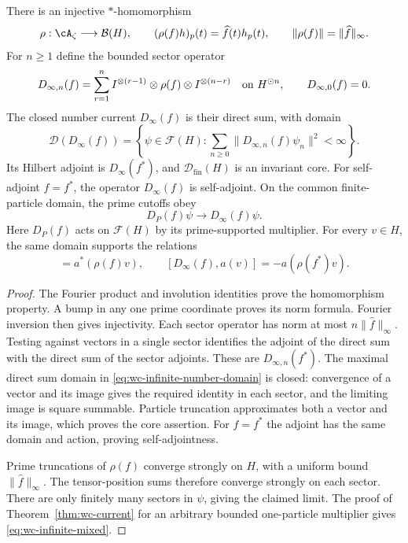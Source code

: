 \begin{proposition}
\label{prop:wc-infinite-multiplication}
There is an injective $*$-homomorphism
\[
 \rho:\cA_\zeta\longrightarrow\mathcal B(H),\qquad
 (\rho(f)h)_p(t)=\widehat f(t)h_p(t),\qquad
 \|\rho(f)\|=\|\widehat f\|_\infty.
\]
For $n\geq1$ define the bounded sector operator
\[
 D_{\infty,n}(f)=\sum_{r=1}^n
 I^{\otimes(r-1)}\otimes\rho(f)\otimes I^{\otimes(n-r)}
 \quad\hbox{on }H^{\odot n},\qquad D_{\infty,0}(f)=0.
\]
The closed number current $D_\infty(f)$ is their direct sum, with domain
\begin{equation}
 \mathcal D(D_\infty(f))=
 \left\{\psi\in\mathcal F(H):
 \sum_{n\geq0}\|D_{\infty,n}(f)\psi_n\|^2<\infty\right\}.
 \label{eq:wc-infinite-number-domain}
\end{equation}
Its Hilbert adjoint is $D_\infty(f^*)$, and
$\mathcal D_{\mathrm{fin}}(H)$ is an invariant core.
For self-adjoint $f=f^*$, the operator $D_\infty(f)$ is self-adjoint.
On the common finite-particle domain, the prime cutoffs obey
\[
 D_P(f)\psi\longrightarrow D_\infty(f)\psi.
\]
Here $D_P(f)$ acts on $\mathcal F(H)$ by its prime-supported multiplier.
For every $v\in H$, the same domain supports the relations
\begin{equation}
 [D_\infty(f),a^*(v)]=a^*(\rho(f)v),\qquad
 [D_\infty(f),a(v)]=-a(\rho(f^*)v).
 \label{eq:wc-infinite-mixed}
\end{equation}
\end{proposition}
\begin{proof}
The Fourier product and involution identities prove the homomorphism
property.  A bump in any one prime coordinate proves its norm formula.
Fourier inversion then gives injectivity.
Each sector operator has norm at most $n\|\widehat f\|_\infty$.
Testing against vectors in a single sector identifies the adjoint of
the direct sum with the direct sum of the sector adjoints.
These are $D_{\infty,n}(f^*)$.
The maximal direct sum domain in \eqref{eq:wc-infinite-number-domain}
is closed: convergence of a vector and its image gives the required
identity in each sector, and the limiting image is square summable.
Particle truncation approximates both a vector and its image, which
proves the core assertion.  For $f=f^*$ the adjoint has the same domain
and action, proving self-adjointness.

Prime truncations of $\rho(f)$ converge strongly on $H$, with a uniform
bound $\|\widehat f\|_\infty$.
The tensor-position sums therefore converge strongly on each sector.
There are only finitely many sectors in $\psi$, giving the claimed limit.
The proof of Theorem~\ref{thm:wc-current} for an arbitrary bounded
one-particle multiplier gives \eqref{eq:wc-infinite-mixed}.
\end{proof}


